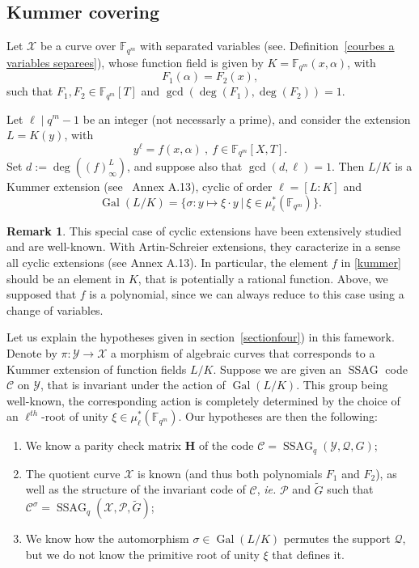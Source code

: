 \documentclass[10pt]{article}
\theoremstyle{definition}
\newtheorem{rq1}[thm]{Remark}
\theoremstyle{definition}
\theoremstyle{definition}
\newcommand{\cd}{\cdot}
\newcommand{\fqm}{\mathbb{F}_{q^m}}
\newcommand{\X}{\mathcal{X}}
\newcommand{\Y}{\mathcal{Y}}
\newcommand{\PR}{\mathcal{P}}
\newcommand{\QR}{\mathcal{Q}}
\newcommand{\Gal}{\operatorname{Gal}}
\newcommand{\ssag}{\operatorname{SSAG}}
\begin{document}
\subsection{Kummer covering} \label{sectionkummer}


Let $\X$ be a curve over $\fqm$ with separated variables (see. Definition~\ref{courbes a variables separees}), whose function field is given by $K=\fqm(x,\alpha)$, with
\[F_1(\alpha) = F_2(x),\] 
such that $F_1,F_2 \in \fqm[T]$ and $\gcd(\deg(F_1),\deg(F_2))=1$. 

Let $\ell \mid q^m-1$ be an integer (not necessarly a prime), and consider the extension $L=K(y)$, with
\begin{equation} \label{kummer}
y^{\ell} = f(x,\alpha) \ , \ f \in \fqm[X,T]. 
\end{equation}
Set $d:=\deg\left((f)^L_{\infty}\right)$, and suppose also that $\gcd(d,\ell)=1$. Then $L/K$ is a Kummer extension (see~\cite{Sti} Annex A.13), cyclic of order $\ell=[L:K]$ and 
\[\Gal(L/K) = \{ \sigma : y \mapsto \xi \cd y \ | \ \xi \in \mu^*_{\ell}(\fqm)\}.\] 

\begin{rq1} \label{pk des polynomes}
This special case of cyclic extensions have been extensively studied and are well-known. With Artin-Schreier extensions, they caracterize in a sense all cyclic extensions (see \cite{Sti} Annex A.13). In particular, the element $f$ in \eqref{kummer} should be an element in $K$, that is potentially a rational function. Above, we supposed that $f$ is a polynomial, since we can always reduce to this case using a change of variables.
\end{rq1}

Let us explain the hypotheses given in section~\ref{sectionfour}) in this famework. Denote by $\pi : \Y \longrightarrow \X$ a morphism of algebraic curves that corresponds to a Kummer extension of function fields $L/K$. Suppose we are given an $\ssag$ code $\mathcal{C}$ on $\Y$, that is invariant under the action of $\Gal(L/K)$. This group being well-known, the corresponding action is completely determined by the choice of an $\ell^{th}$-root of unity $\xi \in \mu^*_{\ell}(\fqm)$. Our hypotheses are then the following:

\begin{enumerate}
\item We know a parity check matrix $\mathbf{H}$ of the code $\mathcal{C} = \ssag_q(\Y,\QR,G)$;
\item The quotient curve $\X$ is known (and thus both polynomials $F_1$ and $F_2$), as well as the structure of the invariant code of $\mathcal{C}$, \textit{ie.} $\PR$ and $\tilde{G}$ such that $\mathcal{C}^{\sigma} = \ssag_q(\X,\PR,\tilde{G})$;
\item We know how the automorphism $\sigma \in \Gal(L/K)$ permutes the support $\QR$, but we do not know the primitive root of unity $\xi$ that defines it.
\end{enumerate}
\end{document}
